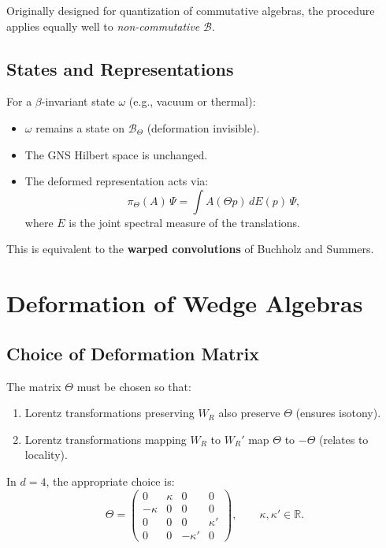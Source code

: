 \documentclass[11pt,a4paper]{article}
\begin{document}
Originally designed for quantization of commutative algebras, the procedure
applies equally well to \emph{non-commutative} $\mathcal{B}$.

\subsection{States and Representations}

For a $\beta$-invariant state $\omega$ (e.g., vacuum or thermal):
\begin{itemize}[nosep]
  \item $\omega$ remains a state on $\mathcal{B}_\Theta$ (deformation invisible).
  \item The GNS Hilbert space is unchanged.
  \item The deformed representation acts via:
        \begin{equation}
          \pi_\Theta(A)\, \Psi = \int A(\Theta p)\, dE(p)\, \Psi,
        \end{equation}
        where $E$ is the joint spectral measure of the translations.
\end{itemize}

This is equivalent to the \textbf{warped convolutions} of Buchholz and Summers.

\section{Deformation of Wedge Algebras}

\subsection{Choice of Deformation Matrix}

The matrix $\Theta$ must be chosen so that:
\begin{enumerate}[nosep]
  \item Lorentz transformations preserving $W_R$ also preserve $\Theta$
        (ensures isotony).
  \item Lorentz transformations mapping $W_R$ to $W_R'$ map $\Theta$ to
        $-\Theta$ (relates to locality).
\end{enumerate}

In $d=4$, the appropriate choice is:
\begin{equation}
  \Theta = \begin{pmatrix}
  0 & \kappa & 0 & 0 \\
  -\kappa & 0 & 0 & 0 \\
  0 & 0 & 0 & \kappa' \\
  0 & 0 & -\kappa' & 0
  \end{pmatrix},
  \qquad \kappa, \kappa' \in \mathbb{R}.
\end{equation}
\end{document}
